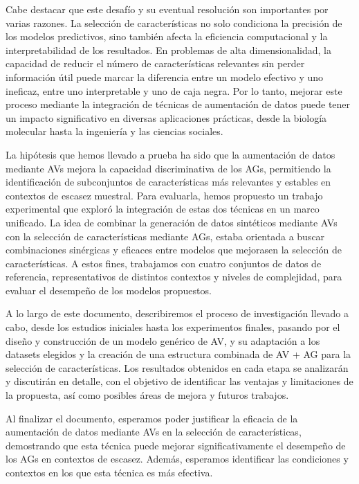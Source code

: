 Cabe destacar que este desafío y su eventual resolución son importantes por varias razones. La selección de características no solo condiciona la precisión de los modelos predictivos, sino también afecta la eficiencia computacional y la interpretabilidad de los resultados. En problemas de alta dimensionalidad, la capacidad de reducir el número de características relevantes sin perder información útil puede marcar la diferencia entre un modelo efectivo y uno ineficaz, entre uno interpretable y uno de caja negra. Por lo tanto, mejorar este proceso mediante la integración de técnicas de aumentación de datos puede tener un impacto significativo en diversas aplicaciones prácticas, desde la biología molecular hasta la ingeniería y las ciencias sociales.

La hipótesis que hemos llevado a prueba ha sido que la aumentación de datos mediante AVs mejora la capacidad discriminativa de los AGs, permitiendo la identificación de subconjuntos de características más relevantes y estables en contextos de escasez muestral. Para evaluarla, hemos propuesto un trabajo experimental que exploró la integración de estas dos técnicas en un marco unificado. La idea de combinar la generación de datos sintéticos mediante AVs con la selección de características mediante AGs, estaba orientada a buscar combinaciones sinérgicas y eficaces entre modelos que mejorasen la selección de características. A estos fines, trabajamos con cuatro conjuntos de datos de referencia, representativos de distintos contextos y niveles de complejidad, para evaluar el desempeño de los modelos propuestos.

A lo largo de este documento, describiremos el proceso de investigación llevado a cabo, desde los estudios iniciales hasta los experimentos finales, pasando por el diseño y construcción de un modelo genérico de AV, y su adaptación a los datasets elegidos y la creación de una estructura combinada de AV + AG para la selección de características. Los resultados obtenidos en cada etapa se analizarán y discutirán en detalle, con el objetivo de identificar las ventajas y limitaciones de la propuesta, así como posibles áreas de mejora y futuros trabajos.

Al finalizar el documento, esperamos poder justificar la eficacia de la aumentación de datos mediante AVs en la selección de características, demostrando que esta técnica puede mejorar significativamente el desempeño de los AGs en contextos de escasez. Además, esperamos identificar las condiciones y contextos en los que esta técnica es más efectiva.

